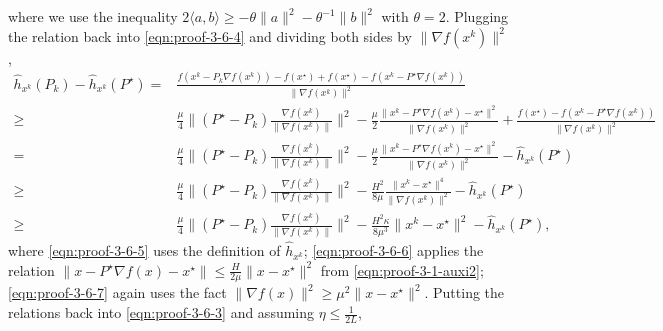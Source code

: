 where we use the inequality $2 \langle a, b \rangle \geq - \theta \| a \|^2 -
\theta^{- 1} \| b \|^2$ with $\theta = 2$. Plugging the relation back into \eqref{eqn:proof-3-6-4} and
dividing both sides by $\| \nabla f (x^k) \|^2$,
\begin{align}
\hat{h}_{x^k} (P_k) - \hat{h}_{x^k} (P^{\star})  ={} & \tfrac{f (x^k - P_k \nabla f (x^k)) - f(x^\star) + f(x^\star) - f (x^k - P^{\star} \nabla f
  (x^k))}{\| \nabla f (x^k) \|^2} \nonumber\\
  \geq{} & \tfrac{\mu}{4} \| (P^{\star} - P_k) \tfrac{\nabla f (x^k)}{\|
  \nabla f (x^k) \|} \|^2 - \tfrac{\mu}{2} \tfrac{\| x^k - P^{\star}
  \nabla f (x^k) - x^{\star} \|^2}{\| \nabla f (x^k) \|^2} + \tfrac{f
  (x^{\star}) - f (x^k - P^{\star} \nabla f (x^k))}{\| \nabla f (x^k) \|^2}
  \nonumber\\
  ={} & \tfrac{\mu}{4} \| (P^{\star} - P_k) \tfrac{\nabla f (x^k)}{\|
  \nabla f (x^k) \|} \|^2 - \tfrac{\mu}{2} \tfrac{\| x^k - P^{\star}
  \nabla f (x^k) - x^{\star} \|^2}{\| \nabla f (x^k) \|^2} - \hat{h}_{x^k}
  (P^{\star}) \label{eqn:proof-3-6-5} \\
  \geq{} & \tfrac{\mu}{4} \| (P^{\star} - P_k) \tfrac{\nabla f (x^k)}{\|
  \nabla f (x^k) \|} \|^2 - \tfrac{H^2}{8 \mu} \tfrac{\| x^k - x^{\star}
  \|^4}{\| \nabla f (x^k) \|^2} - \hat{h}_{x^k} (P^{\star}) \label{eqn:proof-3-6-6}\\
  \geq{} & \tfrac{\mu}{4} \| (P^{\star} - P_k) \tfrac{\nabla f (x^k)}{\|
  \nabla f (x^k) \|} \|^2 - \tfrac{H^2 \kappa}{8 \mu^3} \| x^k -
  x^{\star} \|^2 - \hat{h}_{x^k} (P^{\star}),\label{eqn:proof-3-6-7}
\end{align}
where \eqref{eqn:proof-3-6-5} uses the definition of $\hat{h}_{x^k}$; \eqref{eqn:proof-3-6-6} applies the relation $ \| x - P^\star \nabla f (x) - x^{\star} \| \leq \frac{H}{2\mu} \|x - x^\star\|^2$ from \eqref{eqn:proof-3-1-auxi2}; \eqref{eqn:proof-3-6-7} again uses the fact $\|\nabla f(x) \|^2 \geq \mu^2 \|x - x^\star\|^2$. Putting the relations back into \eqref{eqn:proof-3-6-3} and assuming $\eta \leq \frac{1}{2L}$,
